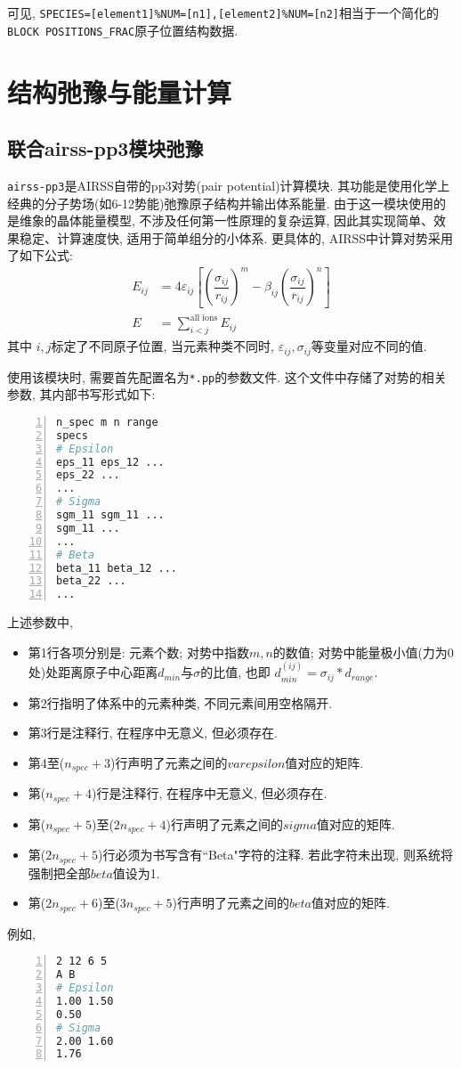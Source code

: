 \documentclass[a4paper, 10pt]{article}
\begin{document}
可见, \verb|SPECIES=[element1]%NUM=[n1],[element2]%NUM=[n2]|相当于一个简化的\verb|BLOCK POSITIONS_FRAC|原子位置结构数据.

\newpage
\section{结构弛豫与能量计算}

\subsection{联合airss-pp3模块弛豫}
\verb|airss-pp3|是AIRSS自带的pp3对势(pair potential)计算模块. 其功能是使用化学上经典的分子势场(如6-12势能)弛豫原子结构并输出体系能量. 由于这一模块使用的是维象的晶体能量模型, 不涉及任何第一性原理的复杂运算, 因此其实现简单、效果稳定、计算速度快, 适用于简单组分的小体系. 更具体的, AIRSS中计算对势采用了如下公式:
\begin{subequations}
  \label{eq:pp3}
  \begin{align}
    E_{ij} &= 4\varepsilon_{ij}\left[\left(\dfrac{\sigma_{ij}}{r_{ij}}\right)^m -\beta_{ij}\left(\dfrac{\sigma_{ij}}{r_{ij}}\right)^n\right]\\
    E &= \sum_{i<j}^{\text{all ions}} E_{ij}
  \end{align}
\end{subequations}
其中 \(i,j\)标定了不同原子位置, 当元素种类不同时, \(\varepsilon_{ij},\sigma_{ij}\)等变量对应不同的值.

使用该模块时, 需要首先配置名为\verb|*.pp|的参数文件. 这个文件中存储了对势的相关参数, 其内部书写形式如下: 
\begin{lstlisting}[language={bash},numbers=left]
n_spec m n range
specs
# Epsilon
eps_11 eps_12 ...
eps_22 ...
...
# Sigma
sgm_11 sgm_11 ... 
sgm_11 ... 
...
# Beta
beta_11 beta_12 ...
beta_22 ...
...
\end{lstlisting}

上述参数中, 
\begin{itemize}
  \item 第1行各项分别是: 元素个数; 对势中指数\(m,n\)的数值; 对势中能量极小值(力为0处)处距离原子中心距离\(d_{min}\)与\(\sigma\)的比值, 也即 \(d_{min}^{(ij)} = \sigma_{ij}*d_{range}\). 
  \item 第2行指明了体系中的元素种类, 不同元素间用空格隔开. 
  \item 第3行是注释行, 在程序中无意义, 但必须存在. 
  \item 第4至(\(n_{spec}+3\))行声明了元素之间的\(varepsilon\)值对应的矩阵.
  \item 第(\(n_{spec}+4\))行是注释行, 在程序中无意义, 但必须存在. 
  \item 第(\(n_{spec}+5\))至(\(2n_{spec}+4\))行声明了元素之间的\(sigma\)值对应的矩阵.
  \item 第(\(2n_{spec}+5\))行必须为书写含有``Beta"字符的注释. 若此字符未出现, 则系统将强制把全部\(beta\)值设为1.
  \item 第(\(2n_{spec}+6\))至(\(3n_{spec}+5\))行声明了元素之间的\(beta\)值对应的矩阵.
\end{itemize}
例如,
\begin{lstlisting}[language={bash},numbers=left]
2 12 6 5
A B
# Epsilon
1.00 1.50
0.50
# Sigma
2.00 1.60
1.76
\end{lstlisting}
\end{document}
